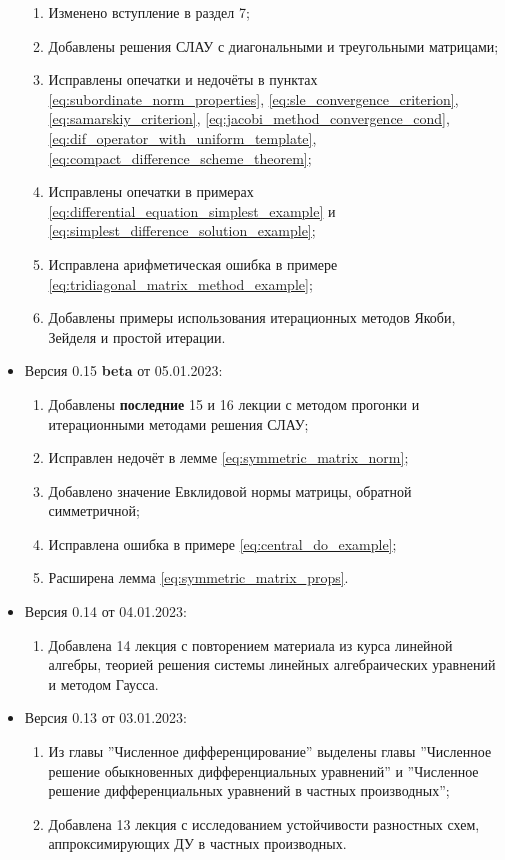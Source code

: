 \documentclass{article}
\begin{document}
\begin{itemize}[nosep]
\begin{enumerate}[nosep]
		\item Изменено вступление в раздел 7;
		\item Добавлены решения СЛАУ с диагональными и треугольными
			матрицами;
		\item Исправлены опечатки и недочёты в пунктах
			\eqref{eq:subordinate_norm_properties},
			\eqref{eq:sle_convergence_criterion},
			\eqref{eq:samarskiy_criterion},
			\eqref{eq:jacobi_method_convergence_cond},
			\eqref{eq:dif_operator_with_uniform_template},
			\eqref{eq:compact_difference_scheme_theorem};
		\item Исправлены опечатки в примерах
			\eqref{eq:differential_equation_simplest_example} и
			\eqref{eq:simplest_difference_solution_example};
		\item Исправлена арифметическая ошибка в примере
			\eqref{eq:tridiagonal_matrix_method_example};
		\item Добавлены примеры использования итерационных методов
			Якоби, Зейделя и простой итерации.
	\end{enumerate}
\item Версия 0.15 \textbf{beta} от 05.01.2023:
	\begin{enumerate}[nosep]
		\item Добавлены \textbf{последние} 15 и 16 лекции с методом
			прогонки и итерационными методами решения СЛАУ;
		\item Исправлен недочёт в лемме
			\eqref{eq:symmetric_matrix_norm};
		\item Добавлено значение Евклидовой нормы матрицы, обратной
			симметричной;
		\item Исправлена ошибка в примере \eqref{eq:central_do_example};
		\item Расширена лемма \eqref{eq:symmetric_matrix_props}.
	\end{enumerate}
\item Версия 0.14 от 04.01.2023:
	\begin{enumerate}[nosep]
		\item Добавлена 14 лекция с повторением материала из курса
			линейной алгебры, теорией решения системы линейных
			алгебраических уравнений и методом Гаусса.
	\end{enumerate}
\item Версия 0.13 от 03.01.2023:
	\begin{enumerate}[nosep]
		\item Из главы ''Численное дифференцирование'' выделены главы
			''Численное решение обыкновенных дифференциальных
			уравнений'' и ''Численное решение дифференциальных
			уравнений в частных производных'';
		\item Добавлена 13 лекция с исследованием устойчивости
			разностных схем, аппроксимирующих ДУ в частных
			производных.
	\end{enumerate}
\end{itemize}
\end{document}
